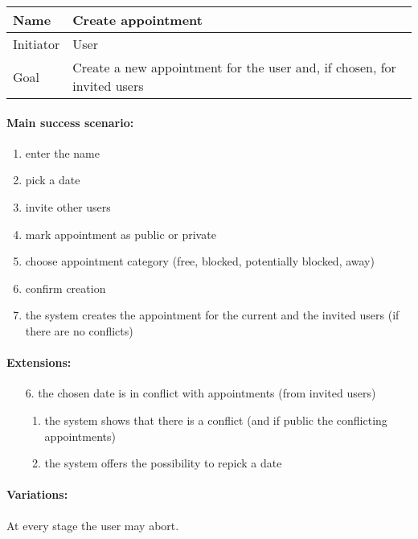 \documentclass[a4paper]{scrartcl}
\begin{document}
\begin{tabular}{|g|l|}
	\hline
Name &  Create appointment \\
	\hline
Initiator &  User \\
	\hline
Goal &  Create a new appointment for the user and, if chosen, for invited users \\
	\hline
\end{tabular}

\paragraph{Main success scenario:}
\begin{enumerate}
	\item enter the name
	\item pick a date
	\item invite other users
	\item mark appointment as public or private
	\item choose appointment category (free, blocked, potentially blocked, away)
	\item confirm creation
	\item the system creates the appointment for the current and the invited users (if there are no conflicts)
\end{enumerate}

\paragraph{Extensions:}
\begin{enumerate}
	\item[6.] the chosen date is in conflict with appointments (from invited users)
		\begin{enumerate}
			\item the system shows that there is a conflict (and if public the conflicting appointments)
			\item the system offers the possibility to repick a date
		\end{enumerate}
\end{enumerate}

\paragraph{Variations:}
At every stage the user may abort.
\end{document}

